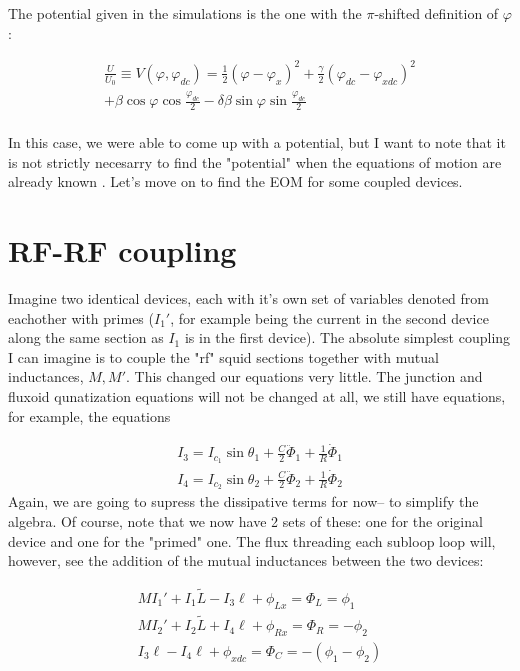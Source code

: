 \documentclass[paper=a4, twocolumn, fontsize=10pt]{article} %
\numberwithin{equation}{section} %
\numberwithin{figure}{section} %
\numberwithin{table}{section} %
\begin{document}
The potential given in the simulations is the one with the $\pi$-shifted definition of $\varphi$:

\begin{align}
    \frac{U}{U_0} \equiv V(\varphi, \varphi_{dc}) =  \frac{1}{2} (\varphi-\varphi_x)^2 + \frac{\gamma}{2} (\varphi_{dc}-\varphi_{xdc})^2
    \\
     + \beta \cos \varphi \cos \frac{\varphi_{dc}}{2} - \delta\beta \sin \varphi \sin \frac{\varphi_{dc}}{2}
    \\
\end{align}



 In this case, we were able to come up with a potential, but I want to note that it is not strictly necesarry to find the "potential" when the equations of motion are already known . Let's move on to find the EOM for some coupled devices.


\section{ RF-RF coupling}

Imagine two identical devices, each with it's own set of variables denoted from eachother with primes ($I_1'$, for example being the current in the second device along the same section as $I_1$ is in the first device). The absolute simplest coupling I can imagine is to couple the "rf" squid sections together with mutual inductances, $M, M'$. This changed our equations very little. The junction and fluxoid qunatization equations will not be changed at all, we still have equations, for example, the equations

\begin{align}
    I_3 = I_{c_1} \sin \theta_1 + \frac{C}{2} \ddot{\Phi}_1 + \frac{1}{R} \dot{\Phi}_1
    \\ 
    I_4 = I_{c_2} \sin \theta_2 + \frac{C}{2} \ddot{\Phi}_2 + \frac{1}{R} \dot{\Phi}_2
    \end{align} 
Again, we are going to supress the dissipative terms for now-- to simplify the algebra. Of course, note that we now have 2 sets of these: one for the original device and one for the "primed" one.  The flux threading each subloop loop will, however, see the addition of the mutual inductances between the two devices:

\begin{align}
    MI_1' + I_1 \tilde{L} - I_3 \ell + \phi_{Lx} = \Phi_{L} = \phi_1
    \\
    MI_2' + I_2 \tilde{L} + I_4 \ell + \phi_{Rx} = \Phi_{R} = -\phi_2
    \\
    I_3 \ell - I_4 \ell + \phi_{xdc} = \Phi_{C} = -(\phi_1 - \phi_2)
\end{align} 
\end{document}
